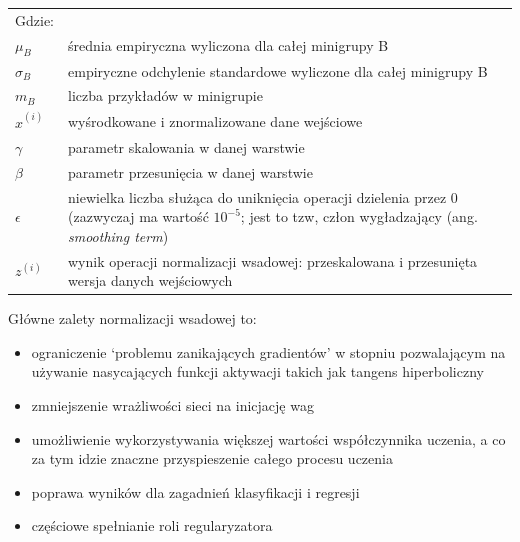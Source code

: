 \documentclass[a4paper,11pt]{article}
\begin{document}
    \begin{tabular}{p{}p{}}
        Gdzie: \\
        $\mu_{B}$           & średnia empiryczna wyliczona dla całej minigrupy B                                                                                                                \\
        $\sigma_{B}$        & empiryczne odchylenie standardowe wyliczone dla całej minigrupy B                                                                                                 \\
        $m_{B}$             & liczba przykładów w minigrupie                                                                                                                                    \\
        $\widehat{x}^{(i)}$ & wyśrodkowane i znormalizowane dane wejściowe                                                                                                                      \\
        $\gamma$            & parametr skalowania w danej warstwie                                                                                                                              \\
        $\beta$             & parametr przesunięcia w danej warstwie                                                                                                                            \\
        $\epsilon$          & niewielka liczba służąca do uniknięcia operacji dzielenia przez 0 (zazwyczaj ma wartość $10^{-5}$; jest to tzw, człon wygładzający (ang. \textit{smoothing term}) \\
        $z^{(i)}$           & wynik operacji normalizacji wsadowej: przeskalowana i przesunięta wersja danych wejściowych                                                                       \\
    \end{tabular}

    \bigskip

    Główne zalety normalizacji wsadowej to\cite{UczenieMaszynowe2018}:
    \begin{itemize}
        \item ograniczenie `problemu zanikających gradientów' w stopniu pozwalającym na używanie nasycających funkcji aktywacji takich jak tangens hiperboliczny
        \item zmniejszenie wrażliwości sieci na inicjację wag
        \item umożliwienie wykorzystywania większej wartości współczynnika uczenia, a co za tym idzie znaczne przyspieszenie całego procesu uczenia
        \item poprawa wyników dla zagadnień klasyfikacji i regresji
        \item częściowe spełnianie roli regularyzatora
    \end{itemize}
\end{document}
